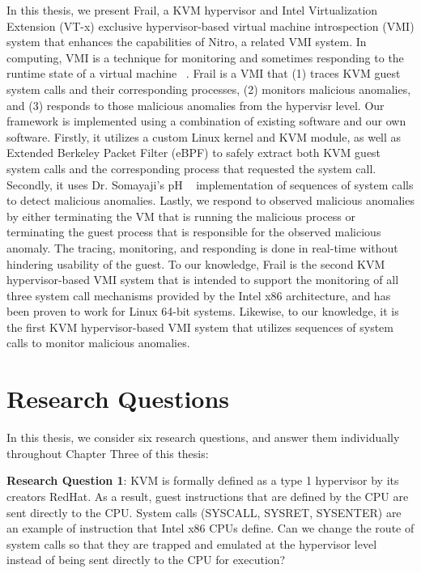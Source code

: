 \documentclass{report}
\begin{document}
\begin{spacing}{1.5}
{\large 
In this thesis, we present Frail, a KVM hypervisor and Intel Virtualization Extension (VT-x) exclusive hypervisor-based virtual machine introspection (VMI) system that enhances the capabilities of Nitro, a related VMI system. In computing, VMI is a technique for monitoring and sometimes responding to the runtime state of a virtual machine ~\cite{Payne2011}. Frail is a VMI that (1) traces KVM guest system calls and their corresponding processes, (2) monitors malicious anomalies, and (3) responds to those malicious anomalies from the hypervisr level. Our framework is implemented using a combination of existing software and our own software. Firstly, it utilizes a custom Linux kernel and KVM module, as well as Extended Berkeley Packet Filter (eBPF) to safely extract both KVM guest system calls and the corresponding process that requested the system call. Secondly, it uses Dr. Somayaji's pH ~\cite{somayaji2002operating} implementation of sequences of system calls to detect malicious anomalies. Lastly, we respond to observed malicious anomalies by either terminating the VM that is running the malicious process or terminating the guest process that is responsible for the observed malicious anomaly. The tracing, monitoring, and responding is done in real-time without hindering usability of the guest. To our knowledge, Frail is the second KVM hypervisor-based VMI system that is intended to support the monitoring of all three system call mechanisms provided by the Intel x86 architecture, and has been proven to work for Linux 64-bit systems. Likewise, to our knowledge, it is the first KVM hypervisor-based VMI system that utilizes sequences of system calls to monitor malicious anomalies. 
\newline
}







\section{Research Questions}

{\large
In this thesis, we consider six research questions, and answer them individually throughout Chapter Three of this thesis:
\newline
}

{\large
\noindent \textbf{Research Question 1}: KVM is formally defined as a type 1 hypervisor by its creators RedHat. As a result, guest instructions that are defined by the CPU are sent directly to the CPU. System calls (SYSCALL, SYSRET, SYSENTER) are an example of instruction that Intel x86 CPUs define. Can we change the route of system calls so that they are trapped and emulated at the hypervisor level instead of being sent directly to the CPU for execution?
\newline
}


\end{spacing}
\end{document}
